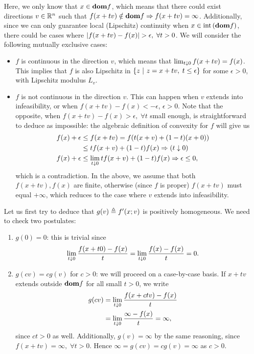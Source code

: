\documentclass[10pt]{article}
\begin{document}
\begin{Exercise}
	Here, we only know that $x \in \textbf{dom} f$, which means that there could exist
	directions $v \in \mathbb{R}^n$ such that $f(x + tv) \notin \textbf{dom} f \Rightarrow
	f(x + tv) = \infty$. Additionally, since we can only guarantee local
	(Lipschitz) continuity when $x \in \mathrm{int}\left( \textbf{dom} f \right)$, there could be cases
	where $\left| f(x + tv) - f(x) \right| > \epsilon, \; \forall t > 0$. We will
	consider the following mutually exclusive cases:
	\begin{itemize}
		\item $f$ is continuous in the direction $v$, which means that
        $\lim_{t \downarrow 0} f(x + tv) = f(x)$. This implies that $f$ is also
        Lipschitz in $\left\{ z \ \middle| \  z = x + tv, \; t \leq \epsilon \right\}$ for some
        $\epsilon > 0$, with Lipschitz modulus $L_v$.
        \item $f$ is not continuous in the direction $v$. This can happen when
        $v$ extends into infeasibility, or when $f(x + tv) - f(x) < -\epsilon$,
        $\epsilon > 0$. Note that the opposite, when $f(x + tv) - f(x) >
        \epsilon, \; \forall t$ small enough, is straightforward to deduce as
	   impossible: the algebraic definition of convexity for $f$ will give us
	   \begin{align*}
		  f(x) + \epsilon &\leq f(x + tv) = f(t(x + v) + (1 - t)(x + 0)) \\
			 &\leq t f(x + v) + (1 - t) f(x) \Rightarrow ( t \downarrow 0 ) \\
		  f(x) + \epsilon &\leq \lim_{t \downarrow 0} t f(x + v) + (1 - t) f(x)
		  \Rightarrow \epsilon \leq 0,
	   \end{align*}
	   which is a contradiction. In the above, we assume that both $f(x + tv),
	   f(x)$ are finite, otherwise (since $f$ is proper) $f(x + tv)$ must equal
	   $+\infty$, which reduces to the case where $v$ extends into
	   infeasibility.
    \end{itemize}

	Let us first try to deduce that $g(v) \triangleq f'(x; v)$ is positively
	homogeneous. We need to check two postulates:
	\begin{enumerate}
		\item $g(0) = 0$: this is trivial since
			\[
				\lim_{t \downarrow 0} \frac{f(x + t 0) - f(x)}{t} =
				\lim_{t \downarrow 0} \frac{f(x) - f(x)}{t} = 0.
			\]
		\item $g(cv) = c g(v)$ for $c > 0$: we will proceed on a case-by-case basis. If $x
			+ tv$ extends outside $\textbf{dom} f$ for all small $t > 0$, we write
			\begin{align*}
				g(cv) &= \lim_{t \downarrow 0} \frac{f(x + c t v) - f(x)}{t} \\
					  &= \lim_{t \downarrow 0} \frac{\infty - f(x)}{t} = \infty,
			\end{align*}
			since $c t > 0$ as well. Additionally, $g(v) = \infty$ by the same
			reasoning, since $f(x + tv) = \infty, \; \forall t > 0$. Hence
			$\infty = g(cv) = c g(v) = \infty$ as $c > 0$.


\end{enumerate}
\end{Exercise}
\end{document}
